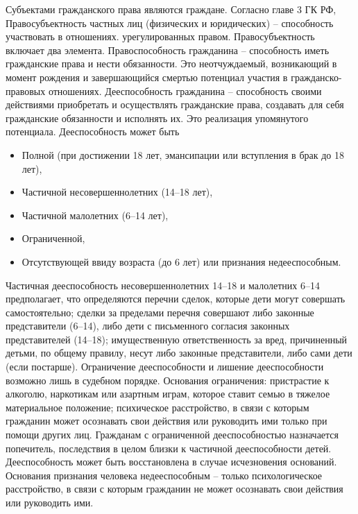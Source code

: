 \documentclass[a4paper, 12pt]{article}
\begin{document}
Субъектами гражданского права являются граждане. Согласно главе 3 ГК РФ, 
Правосубъектность частных лиц (физических и юридических) -- способность участвовать в отношениях. урегулированных правом. 
Правосубъектность включает два элемента. 
Правоспособность гражданина -- способность иметь гражданские права и нести обязанности. 
Это неотчуждаемый, возникающий в момент рождения и завершающийся смертью потенциал участия в гражданско-правовых отношениях. 
Дееспособность гражданина -- способность своими действиями приобретать и осуществлять гражданские права, создавать для себя гражданские обязанности и исполнять их. 
Это реализация упомянутого потенциала. 
Дееспособность может быть 
\begin{itemize}
\item Полной (при достижении 18 лет, эмансипации или вступления в брак до 18 лет),
\item Частичной несовершеннолетних (14--18 лет),
\item Частичной малолетних (6--14 лет),
\item Ограниченной, 
\item Отсутствующей ввиду возраста (до 6 лет) или признания недееспособным.
\end{itemize}
Частичная дееспособность несовершеннолетних 14--18 и малолетних 6--14 предполагает, что определяются перечни сделок, которые дети могут совершать самостоятельно; 
сделки за пределами перечня совершают либо законные представители (6--14), либо дети с письменного согласия законных представителей (14--18);
имущественную ответственность за вред, причиненный детьми, по общему правилу, несут либо законные представители, либо сами дети (если постарше). 
Ограничение дееспособности и лишение дееспособности возможно лишь в судебном порядке. Основания ограничения: пристрастие к алкоголю, наркотикам или азартным играм, которое ставит семью в тяжелое материальное положение; психическое расстройство, в связи с которым гражданин может осознавать свои действия или руководить ими только при помощи других лиц. 
Гражданам с ограниченной дееспособностью назначается попечитель, последствия в целом близки к частичной дееспособности детей. Дееспособность может быть восстановлена в случае исчезновения оснований. 
Основания признания человека недееспособным -- только психологическое расстройство, в связи с которым гражданин не может осознавать свои действия или руководить ими. 
\end{document}
